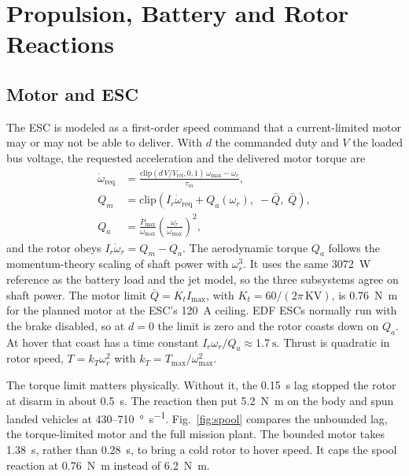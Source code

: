 \documentclass[journal]{IEEEtran}
\newcommand{\reffig}[1]{Fig.~\ref{#1}}
\newcommand{\Ir}{I_r}
\newcommand{\wrot}{\omega_r}
\newcommand{\wmax}{\omega_{\max}}
\begin{document}
\section{Propulsion, Battery and Rotor Reactions}
\label{sec:propulsion}

\subsection{Motor and ESC}
\label{sec:motor}

The ESC is modeled as a first-order speed command that a current-limited motor may or may not be able to deliver.
With $d$ the commanded duty and $V$ the loaded bus voltage, the requested acceleration and the delivered motor torque are
\begin{align}
\dot\omega_{\text{req}} &= \frac{\mathrm{clip}(d\,V/V_{\text{ref}}, 0, 1)\,\wmax - \wrot}{\tau_m}, \label{eq:esc}\\
Q_m &= \mathrm{clip}\!\left(\Ir\dot\omega_{\text{req}} + Q_a(\wrot),\; -\bar Q,\; \bar Q\right), \label{eq:motor}\\
Q_a &= \frac{P_{\max}}{\wmax}\left(\frac{\wrot}{\wmax}\right)^{2}, \nonumber
\end{align}
and the rotor obeys $\Ir\dot\omega_r = Q_m - Q_a$.
The aerodynamic torque $Q_a$ follows the momentum-theory scaling of shaft power with $\wrot^3$.
It uses the same \SI{3072}{\watt} reference as the battery load and the jet model, so the three subsystems agree on shaft power.
The motor limit $\bar Q = K_t I_{\max}$, with $K_t = 60/(2\pi\,\mathrm{KV})$, is \SI{0.76}{\newton\metre} for the planned motor at the ESC's \SI{120}{\ampere} ceiling.
EDF ESCs normally run with the brake disabled, so at $d=0$ the limit is zero and the rotor coasts down on $Q_a$.
At hover that coast has a time constant $\Ir\wrot/Q_a \approx \SI{1.7}{\second}$.
Thrust is quadratic in rotor speed, $T = k_T\wrot^2$ with $k_T = T_{\max}/\wmax^2$.

The torque limit matters physically.
Without it, the \SI{0.15}{\second} lag stopped the rotor at disarm in about \SI{0.5}{\second}.
The reaction then put \SI{5.2}{\newton\metre} on the body and spun landed vehicles at 430--\SI{710}{\degree\per\second}.
\reffig{fig:spool} compares the unbounded lag, the torque-limited motor and the full mission plant.
The bounded motor takes \SI{1.38}{\second}, rather than \SI{0.28}{\second}, to bring a cold rotor to hover speed.
It caps the spool reaction at \SI{0.76}{\newton\metre} instead of \SI{6.2}{\newton\metre}.
\end{document}
